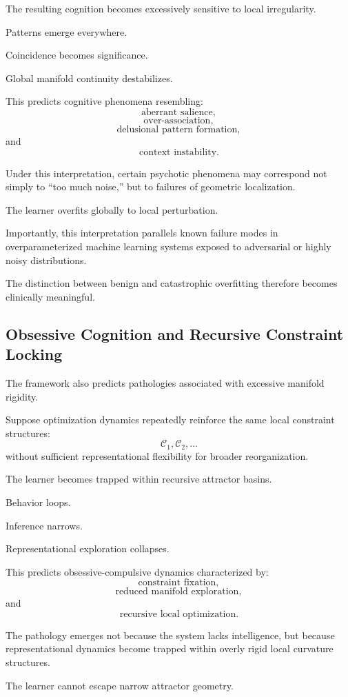 \documentclass[12pt,a4paper]{article}
\begin{document}
The resulting cognition becomes excessively sensitive to local irregularity.

Patterns emerge everywhere.

Coincidence becomes significance.

Global manifold continuity destabilizes.

This predicts cognitive phenomena resembling:
\[
\text{aberrant salience},
\]
\[
\text{over-association},
\]
\[
\text{delusional pattern formation},
\]
and
\[
\text{context instability}.
\]

Under this interpretation, certain psychotic phenomena may correspond not simply to “too much noise,” but to failures of geometric localization.

The learner overfits globally to local perturbation.

Importantly, this interpretation parallels known failure modes in overparameterized machine learning systems exposed to adversarial or highly noisy distributions.

The distinction between benign and catastrophic overfitting therefore becomes clinically meaningful.

\subsection{Obsessive Cognition and Recursive Constraint Locking}

The framework also predicts pathologies associated with excessive manifold rigidity.

Suppose optimization dynamics repeatedly reinforce the same local constraint structures:
\[
\mathcal{C}_1,
\mathcal{C}_2,
\ldots
\]
without sufficient representational flexibility for broader reorganization.

The learner becomes trapped within recursive attractor basins.

Behavior loops.

Inference narrows.

Representational exploration collapses.

This predicts obsessive-compulsive dynamics characterized by:
\[
\text{constraint fixation},
\]
\[
\text{reduced manifold exploration},
\]
and
\[
\text{recursive local optimization}.
\]

The pathology emerges not because the system lacks intelligence, but because representational dynamics become trapped within overly rigid local curvature structures.

The learner cannot escape narrow attractor geometry.
\end{document}
